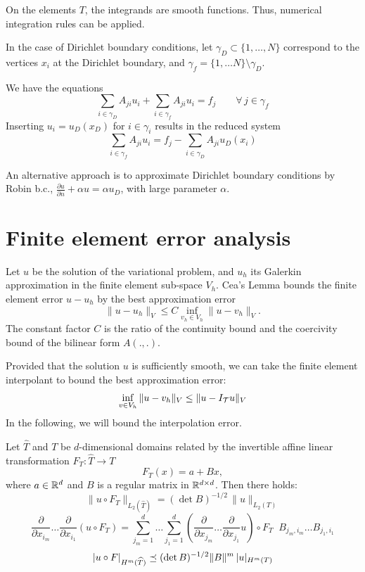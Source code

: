 \bigskip

On the elements $T$, the integrands are smooth functions. Thus, numerical
integration rules can be applied.

\bigskip

In the case of Dirichlet boundary conditions,
let $\gamma_D \subset \{ 1, \ldots , N \}$ correspond to the vertices $x_i$
at the Dirichlet boundary, and $\gamma_f = \{ 1, \ldots N \} \setminus \gamma_D$.

We have the equations
$$
\sum_{i \in \gamma_D} A_{ji} u_i + \sum_{i \in \gamma_f} A_{ji} u_i = f_j
\qquad \forall \, j \in \gamma_f
$$
Inserting $u_i = u_D(x_D)$ for $i \in \gamma_i$ results in the reduced system
$$
\sum_{i \in \gamma_f} A_{ji} u_i = f_j - \sum_{i \in \gamma_D} A_{ji} u_D(x_i)
$$

An alternative approach is to approximate Dirichlet boundary conditions by
Robin b.c., $\frac{\partial u}{\partial n} + \alpha u = \alpha u_D$, with large 
parameter $\alpha$.

\section{Finite element error analysis}
%
Let $u$ be the solution of the variational problem, and $u_h$ its
Galerkin approximation in the finite element sub-space $V_h$. Cea's Lemma 
bounds the finite element error $u - u_h$ by the 
best approximation error 
$$
\| u - u_h \|_V \leq C \inf_{v_h \in V_h} \| u - v_h \|_V.
$$
The constant factor $C$ is the ratio of the continuity bound and the
coercivity bound of the bilinear form $A(.,.)$.

Provided that the solution $u$ is sufficiently smooth,
we can take the finite element interpolant to bound the best approximation 
error:
$$
\inf_{v \in V_h} \| u - v_h \|_V \leq \| u - I_{\cal T} u \|_V
$$
In the following, we will bound the interpolation error.


\begin{lemma} Let $\widehat T$ and $T$ be $d$-dimensional domains related
by the invertible affine linear transformation $F_T : \widehat T \rightarrow T $ 
$$
F_T (x) = a + B x,
$$
where $a \in {\mathbb R}^d$ and $B$ is a regular matrix in ${\mathbb R}^{d\times d}$.
Then there holds:
\begin{equation}
\| u \circ F_T \|_{L_2(\widehat T)} = (\det B)^{-1/2} \, \| u  \|_{L_2(T)}
\end{equation}
%
\begin{equation}
\frac{\partial}{\partial x_{i_m}} \ldots 
\frac{\partial}{\partial x_{i_1}} \left( u \circ F_T \right) = 
\sum_{j_m = 1}^d \ldots \sum_{j_1=1}^d 
\left(
\frac{\partial}{\partial x_{j_m}} \ldots 
\frac{\partial}{\partial x_{j_1}} u \right) \circ F_T \; \;
B_{j_m,i_m} \ldots B_{j_1, i_1}
\end{equation}
%
\begin{equation}
| u \circ F |_{H^m(\widehat T)} \preceq (\det B)^{-1/2} \| B \|^m  \, | u |_{H^m(T)}
\end{equation}
\end{lemma}

